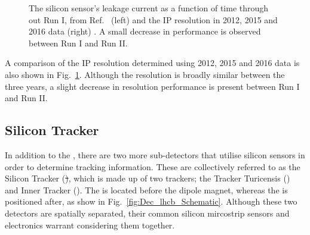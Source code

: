 \begin{figure}[!h]
\begin{subfigure}[m]{0.4\textwidth}
    \end{subfigure}
    \caption{The \velo silicon sensor's leakage current as a function of time through out Run I, from Ref.~\cite{Rinnert:2015uns} (left) and the \velo IP resolution in 2012, 2015 and 2016 data (right) . A small decrease in performance is observed between Run I and Run II.}
    \label{fig:Dec_velo_run2_performance}   
\end{figure}

A comparison of the IP resolution determined using 2012, 2015 and 2016 data is also shown in Fig.~\ref{fig:Dec_velo_run2_performance}. Although the resolution is broadly similar between the three years, a slight decrease in resolution performance is present between Run I and Run II. 









\subsection{Silicon Tracker}

In addition to the \velo, there are two more sub-detectors that utilise silicon sensors in order to determine tracking information. These are collectively referred to as the Silicon Tracker (\st), which is made up of two trackers; the Tracker Turicensis (\ttracker) and Inner Tracker (\intr). The \ttracker is located before the dipole magnet, whereas the \intr is positioned after, as show in Fig.~\ref{fig:Dec_lhcb_Schematic}. Although these two detectors are spatially separated, their common silicon mircostrip sensors and electronics warrant considering them together.

